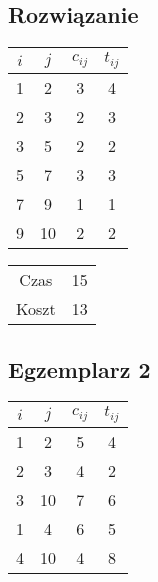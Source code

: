 \documentclass[12pt, letterpaper]{article}
\begin{document}
\subsection{Rozwiązanie}

\begin{center}
  \begin{tabular}{|c|c|c|c|}
    \hline
    \( i \) & \( j \) & \( c_{ij} \) & \( t_{ij} \) \\
    \hline
    1       & 2       & 3            & 4            \\
    2       & 3       & 2            & 3            \\
    3       & 5       & 2            & 2            \\
    5       & 7       & 3            & 3            \\
    7       & 9       & 1            & 1            \\
    9       & 10      & 2            & 2            \\
    \hline
  \end{tabular}
\end{center}

\begin{center}
  \begin{tabular}{|c|c|}
    \hline
    Czas  & 15 \\
    Koszt & 13 \\
    \hline
  \end{tabular}
\end{center}

\subsection{Egzemplarz 2}

\begin{center}
  \begin{tabular}{|c|c|c|c|}
    \hline
    \( i \) & \( j \) & \( c_{ij} \) & \( t_{ij} \) \\
    \hline
    1       & 2       & 5            & 4            \\
    2       & 3       & 4            & 2            \\
    3       & 10      & 7            & 6            \\
    1       & 4       & 6            & 5            \\
    4       & 10      & 4            & 8            \\
    \hline
  \end{tabular}
\end{center}
\end{document}
